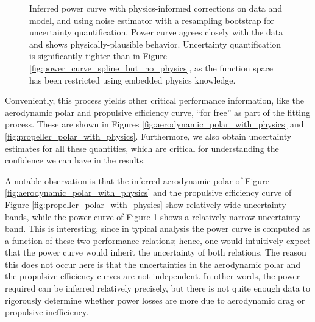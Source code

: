 \begin{figure}[!htb]
    \centering
    \caption{Inferred power curve with physics-informed corrections on data and model, and using noise estimator with a resampling bootstrap for uncertainty quantification. Power curve agrees closely with the data and shows physically-plausible behavior. Uncertainty quantification is significantly tighter than in Figure \ref{fig:power_curve_spline_but_no_physics}, as the function space has been restricted using embedded physics knowledge.}
    \label{fig:power_curve_with_physics}
\end{figure}

Conveniently, this process yields other critical performance information, like the aerodynamic polar and propulsive efficiency curve, ``for free'' as part of the fitting process. These are shown in Figures \ref{fig:aerodynamic_polar_with_physics} and \ref{fig:propeller_polar_with_physics}. Furthermore, we also obtain uncertainty estimates for all these quantities, which are critical for understanding the confidence we can have in the results.

A notable observation is that the inferred aerodynamic polar of Figure \ref{fig:aerodynamic_polar_with_physics} and the propulsive efficiency curve of Figure \ref{fig:propeller_polar_with_physics} show relatively wide uncertainty bands, while the power curve of Figure \ref{fig:power_curve_with_physics} shows a relatively narrow uncertainty band. This is interesting, since in typical analysis the power curve is computed as a function of these two performance relations; hence, one would intuitively expect that the power curve would inherit the uncertainty of both relations. The reason this does not occur here is that the uncertainties in the aerodynamic polar and the propulsive efficiency curves are not independent. In other words, the power required can be inferred relatively precisely, but there is not quite enough data to rigorously determine whether power losses are more due to aerodynamic drag or propulsive inefficiency.

